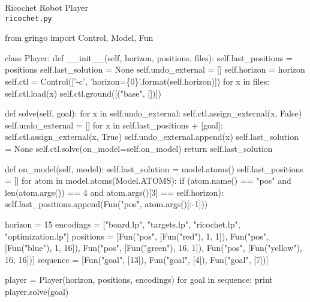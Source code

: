 \begin{frame}[fragile]{Ricochet Robot Player\\[-5pt]\large\texttt{ricochet.py}}
\Tiny\vspace{-15pt}
\begin{semiverbatim}
from gringo import Control, Model, Fun

class Player:
    def __init__(self, horizon, positions, files):
        self.last_positions = positions
        self.last_solution = None
        self.undo_external = []
        self.horizon = horizon
        self.ctl = Control(['-c', 'horizon=\{0\}'.format(self.horizon)])
        for x in files:
            self.ctl.load(x)
        self.ctl.ground([("base", [])])

    def solve(self, goal):
        for x in self.undo_external:
            self.ctl.assign_external(x, False)
        self.undo_external = []
        for x in self.last_positions + [goal]:
            self.ctl.assign_external(x, True)
            self.undo_external.append(x)
        self.last_solution = None
        self.ctl.solve(on_model=self.on_model)
        return self.last_solution

    def on_model(self, model):
        self.last_solution = model.atoms()
        self.last_positions = []
        for atom in model.atoms(Model.ATOMS):
            if (atom.name() == "pos" and len(atom.args()) == 4 and atom.args()[3] == self.horizon):
                self.last_positions.append(Fun("pos", atom.args()[:-1]))

horizon   = 15
encodings = ["board.lp", "targets.lp", "ricochet.lp", "optimization.lp"]
positions = [Fun("pos", [Fun("red"),     1,  1]), Fun("pos", [Fun("blue"),    1, 16]),
             Fun("pos", [Fun("green"),  16,  1]), Fun("pos", [Fun("yellow"), 16, 16])]
sequence  = [Fun("goal", [13]), Fun("goal", [4]), Fun("goal", [7])]

player = Player(horizon, positions, encodings)
for goal in sequence:
    print player.solve(goal)
\end{semiverbatim}
\end{frame}
